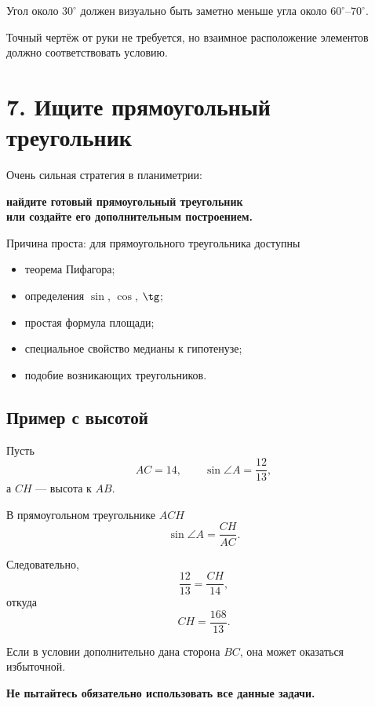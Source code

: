 \documentclass[a4paper,12pt]{article}
\newcommand{\key}[1]{\textcolor{darkaccent}{\textbf{#1}}}
\begin{document}
Угол около \(30^\circ\) должен визуально быть заметно меньше угла около \(60^\circ\)--\(70^\circ\).

Точный чертёж от руки не требуется, но взаимное расположение элементов должно соответствовать условию.


\newpage
\section*{\textcolor{darkaccent}{7. Ищите прямоугольный треугольник}}

Очень сильная стратегия в планиметрии:

\begin{center}
\large
\textcolor{darkaccent}{
\textbf{найдите готовый прямоугольный треугольник\\
или создайте его дополнительным построением.}
}
\end{center}

Причина проста: для прямоугольного треугольника доступны

\begin{itemize}
    \item теорема Пифагора;
    \item определения \(\sin\), \(\cos\), \(\tg\);
    \item простая формула площади;
    \item специальное свойство медианы к гипотенузе;
    \item подобие возникающих треугольников.
\end{itemize}

\subsection*{Пример с высотой}

Пусть
\[
AC=14,
\qquad
\sin\angle A=\frac{12}{13},
\]
а \(CH\) --- высота к \(AB\).

В прямоугольном треугольнике \(ACH\)
\[
\sin\angle A
=
\frac{CH}{AC}.
\]

Следовательно,
\[
\frac{12}{13}
=
\frac{CH}{14},
\]
откуда
\[
\boxed{
CH=\frac{168}{13}.
}
\]

Если в условии дополнительно дана сторона \(BC\), она может оказаться избыточной.

\key{Не пытайтесь обязательно использовать все данные задачи.}

\end{document}
